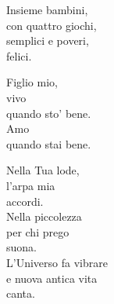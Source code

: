 \begin{haiku}
Insieme bambini,\\
con quattro giochi,\\
semplici e poveri,\\
felici.\\
\end{haiku}

\begin{haiku}
        Figlio mio,\\
        vivo\\
        quando sto' bene.\\
        Amo\\
        quando stai bene.\\
\end{haiku}


\begin{haiku}
    Nella Tua lode,\\
    l'arpa mia\\
    accordi.\\
    Nella piccolezza\\
    per chi prego\\
    suona.\\
    L'Universo fa vibrare\\
    e nuova antica vita\\
    canta.\\
\end{haiku}


